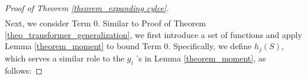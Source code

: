 \begin{proof}[Proof of Theorem \ref{theorem_expanding cylce}]
\begin{align}
\end{align}
Next, we consider Term 0. Similar to Proof of Theorem \ref{theo_transformer_generalization}, we first introduce a set of functions and apply Lemma \ref{theorem_moment} to bound Term 0. Specifically, we define $h_j(S)$, which serves a similar role to the $g_i$ 's in Lemma \ref{theorem_moment}, as follows:


\end{proof}

